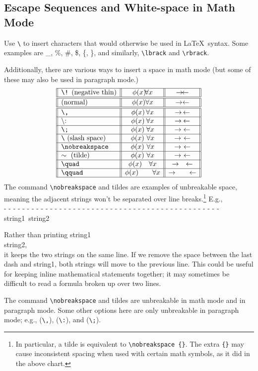 \documentclass{article} 		%
\begin{document}
\subsection{Escape Sequences and White-space in Math Mode} \label{subsec:escape}
Use \verb$\$ to insert characters that would otherwise be used in \LaTeX\ syntax. Some examples are \_, \%, \#, \$, \{, \}, and similarly, \verb$\lbrack$ and \verb$\rbrack$. \par
Additionally, there are various ways to insert a space in math mode (but some of these may also be used in paragraph mode.) 
\newpage
\[
	\begin{array}{||l||c||c||}
	\hline \text{\texttt{\textbackslash !} (negative thin)} & \phi(x) \!\forall x & \rightarrow\!\leftarrow \\ \hline\hline
	\text{(normal)} & \phi(x) \forall x & \rightarrow\leftarrow \\ \hline\hline
	\texttt{\textbackslash ,} & \phi(x)\,\forall x & \rightarrow\,\leftarrow \\ \hline
	\text{\textbackslash :} & \phi(x)\:\forall x & \rightarrow\:\leftarrow \\ \hline
	\texttt{\textbackslash ;} & \phi(x)\;\forall x & \rightarrow\;\leftarrow \\ \hline
	\text{\texttt{\textbackslash} (slash space)} & \phi(x)\ \forall x & \rightarrow \ \leftarrow\\ \hline
	\texttt{\textbackslash nobreakspace} & \phi(x)\nobreakspace\forall x & \rightarrow\nobreakspace\leftarrow \\ \hline
	\sim \text{ (tilde)} & \phi(x)~\forall x & \rightarrow~\leftarrow \\ \hline
	\texttt{\textbackslash quad} & \phi(x) \quad \forall x & \rightarrow \quad \leftarrow \\ \hline
	\texttt{\textbackslash qquad} & \phi(x) \qquad \forall x & \rightarrow \qquad \leftarrow \\ \hline
	\end{array}
\]
The command \verb$\nobreakspace$ and tildes are examples of unbreakable space, meaning the adjacent strings won't be separated over line breaks.\footnote{
	In particular, a tilde is equivalent to \texttt{\textbackslash nobreakspace \{\}}. The extra \texttt{\{\}} may cause inconsistent spacing when used with certain math symbols, as it did in the above chart. 
}
E.g.,\\
- - - - - - - - - - - - - - - - - - - - - - - - - - - - - - - - - - - - - - - - - - - - - - - string1~string2 \par
Rather than printing \hspace*{\fill} string1 \\
string2, \\
it keeps the two strings on the same line. If we remove the space between the last dash and string1, both strings will move to the previous line. This could be useful for keeping inline mathematical statements together; it may sometimes be difficult to read a formula broken up over two lines. \par
The command \verb$\nobreakspace$ and tildes are unbreakable in math mode and in paragraph mode. Some other options here are only unbreakable in paragraph mode; e.g., (\verb$\,$), (\verb$\:$), and (\verb$\;$). 
\end{document}
